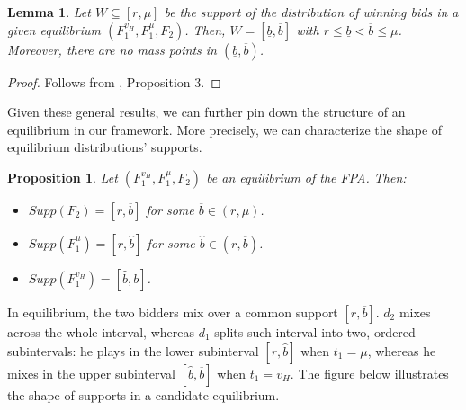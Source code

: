 \documentclass[11pt]{article}
\theoremstyle{plain}
\theoremstyle{definition}
\theoremstyle{plain}
\theoremstyle{plain}
\theoremstyle{plain}
\newtheorem{lem}[thm]{Lemma}
\theoremstyle{plain}
\newtheorem{prop}[thm]{Proposition}
\numberwithin{equation}{section}
\begin{document}
\vspace{0.4cm}

\begin{lem}\label{lem:interval}
Let $ W \subseteq [r, \mu] $ be the support of the distribution of winning bids in a given equilibrium $ \left(F_1^{v_H}, F_1^{\mu}, F_2\right) $. Then, $ W = [\underline b, \overline{b}] $ with $ r \leq \underline{b} < \overline {b} \leq \mu $. Moreover, there are no mass points in $ (\underline b, \overline b) $.
\end{lem}
\begin{proof}
    Follows from \textcite{maskinEquilibriumSealedHigh2000}, Proposition 3.
\end{proof}

\vspace{0.4cm}

\noindent Given these general results, we can further pin down the structure of an equilibrium in our framework. More precisely, we can characterize the shape of equilibrium distributions' supports.

\vspace{0.4cm}

\begin{prop}\label{prop:eqm-supports}
Let $ \left(F_1^{v_H}, F_1^{\mu}, F_2 \right) $ be an equilibrium of the FPA. Then:

\vspace{0.2cm}

\begin{itemize}
    \item[-] $ Supp(F_2) = [r, \overline b] $ for some $ \overline{b} \in (r, \mu) $.

    \vspace{0.4cm}

    \item[-] $ Supp\left(F_1^{\mu}\right) = [r, \hat{b}] $ for some $ \hat{b} \in (r, \overline b) $.

    \vspace{0.4cm}

    \item[-] $ Supp\left(F_1^{v_H}\right) = [\hat{b}, \overline{b}] $.
\end{itemize}
\end{prop}

\vspace{0.2cm}

\noindent In equilibrium, the two bidders mix over a common support $ [r, \overline b] $. $ d_2 $ mixes across the whole interval, whereas $ d_1 $ splits such interval into two, ordered subintervals: he plays in the lower subinterval $ [r, \hat{b}] $ when $ t_1 = \mu $, whereas he mixes in the upper subinterval $ [\hat{b}, \overline{b}] $ when $ t_1 = v_H $. The figure below illustrates the shape of supports in a candidate equilibrium.
\end{document}
